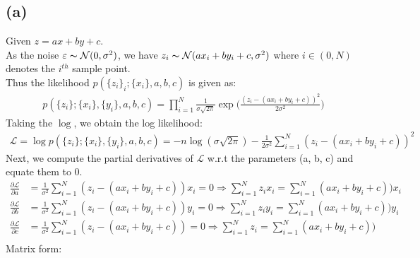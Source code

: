 \documentclass[11pt, fleqn]{article}
\begin{document}
\subsection*{(a)}
Given $z = ax + by +c$. \\
As the noise $\varepsilon \thicksim \mathcal{N}(0, \sigma^2)$, we have $ z_i \thicksim \mathcal{N}(a x_i + b y_i + c, \sigma^2) $ where $i \in (0, N)$ denotes the $i^{th}$ sample point. \\
Thus the likelihood $p(\{z_i\}_i; \{x_i\}, a, b, c)$ is given as:
\begin{equation*}
    \begin{split}
        p(\{z_i\}; \{x_i\}, \{y_i\}, a, b, c) = \prod_{i=1}^{N}\frac{1}{\sigma\sqrt{2\pi}} \exp{\bigg(\frac{(z_i - (ax_i + by_i + c))^2}{2\sigma^2}\bigg)}
    \end{split}
\end{equation*}
Taking the $\log$, we obtain the log likelihood:
\begin{equation}
    \label{logl1}
    \begin{split}
        \boxed{\mathcal{L} = \log{p(\{z_i\}; \{x_i\}, \{y_i\}, a, b, c)} = - n\log(\sigma\sqrt{2\pi}) -\frac{1}{{2\sigma^2}}\sum_{i=1}^{N} (z_i - (ax_i + by_i + c))^2 }
    \end{split}
\end{equation}
Next, we compute the partial derivatives of $\mathcal{L}$ w.r.t the parameters (a, b, c) and equate them to 0.
\begin{equation*}
    \begin{split}
        \frac{\partial \mathcal{L}}{\partial a} &= \frac{1}{{\sigma^2}}\sum_{i=1}^{N} (z_i - (ax_i + by_i + c)) x_i = 0 \Longrightarrow \sum_{i=1}^{N} z_ix_i = \sum_{i=1}^{N} (ax_i + by_i + c)) x_i \\
        \frac{\partial \mathcal{L}}{\partial b} &= \frac{1}{{\sigma^2}}\sum_{i=1}^{N} (z_i - (ax_i + by_i + c)) y_i = 0 \Longrightarrow \sum_{i=1}^{N} z_iy_i = \sum_{i=1}^{N} (ax_i + by_i + c)) y_i \\
        \frac{\partial \mathcal{L}}{\partial c} &= \frac{1}{{\sigma^2}}\sum_{i=1}^{N} (z_i - (ax_i + by_i + c)) = 0 \Longrightarrow \sum_{i=1}^{N} z_i = \sum_{i=1}^{N} (ax_i + by_i + c)) \\
    \end{split}
\end{equation*}
Matrix form:
\end{document}

